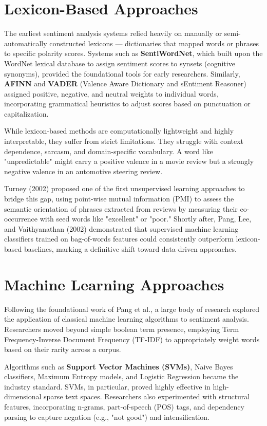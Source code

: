 \documentclass[12pt, a4paper]{report}
\begin{document}
\section{Lexicon-Based Approaches}

The earliest sentiment analysis systems relied heavily on manually or semi-automatically constructed lexicons --- dictionaries that mapped words or phrases to specific polarity scores. Systems such as \textbf{SentiWordNet}, which built upon the WordNet lexical database to assign sentiment scores to synsets (cognitive synonyms), provided the foundational tools for early researchers. Similarly, \textbf{AFINN} and \textbf{VADER} (Valence Aware Dictionary and sEntiment Reasoner) assigned positive, negative, and neutral weights to individual words, incorporating grammatical heuristics to adjust scores based on punctuation or capitalization.

While lexicon-based methods are computationally lightweight and highly interpretable, they suffer from strict limitations. They struggle with context dependence, sarcasm, and domain-specific vocabulary. A word like "unpredictable" might carry a positive valence in a movie review but a strongly negative valence in an automotive steering review. 

Turney (2002) proposed one of the first unsupervised learning approaches to bridge this gap, using point-wise mutual information (PMI) to assess the semantic orientation of phrases extracted from reviews by measuring their co-occurrence with seed words like "excellent" or "poor." Shortly after, Pang, Lee, and Vaithyanathan (2002) demonstrated that supervised machine learning classifiers trained on bag-of-words features could consistently outperform lexicon-based baselines, marking a definitive shift toward data-driven approaches.

\section{Machine Learning Approaches}

Following the foundational work of Pang et al., a large body of research explored the application of classical machine learning algorithms to sentiment analysis. Researchers moved beyond simple boolean term presence, employing Term Frequency-Inverse Document Frequency (TF-IDF) to appropriately weight words based on their rarity across a corpus.

Algorithms such as \textbf{Support Vector Machines (SVMs)}, Naive Bayes classifiers, Maximum Entropy models, and Logistic Regression became the industry standard. SVMs, in particular, proved highly effective in high-dimensional sparse text spaces. Researchers also experimented with structural features, incorporating n-grams, part-of-speech (POS) tags, and dependency parsing to capture negation (e.g., "not good") and intensification.
\end{document}
